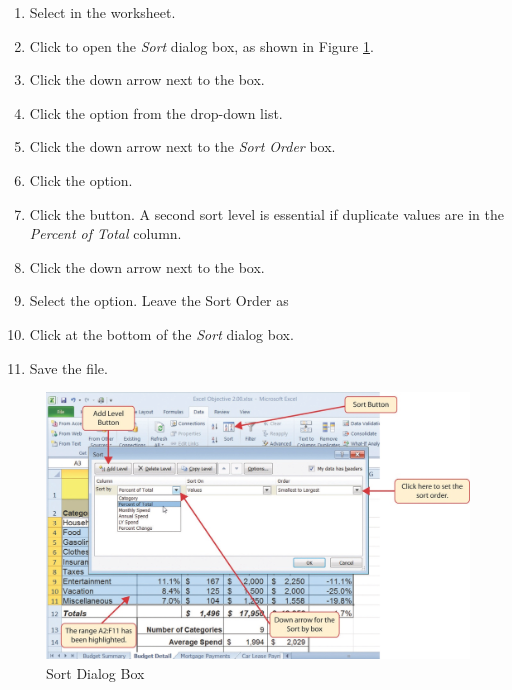\begin{enumbox}
	\begin{enumerate}
		\item Select  in the  worksheet.
		\item Click  to open the \textit{Sort} dialog box, as shown in Figure \ref{02:fig27}.
		\item Click the down arrow next to the  box.
		\item Click the  option from the drop-down list.
		\item Click the down arrow next to the \textit{Sort Order} box.
		\item Click the  option.
		\item Click the  button. A second sort level is essential if duplicate values are in the \textit{Percent of Total} column.
		\item Click the down arrow next to the  box.
		\item Select the  option. Leave the Sort Order as 
		\item Click  at the bottom of the \textit{Sort} dialog box.
		\item Save the  file.
	\end{enumerate}
\end{enumbox}

\begin{figure}[H]
	\centering
	\includegraphics[width=\maxwidth{.95\linewidth}]{gfx/ch02_fig27}
	\caption{Sort Dialog Box}
	\label{02:fig27}
\end{figure}

